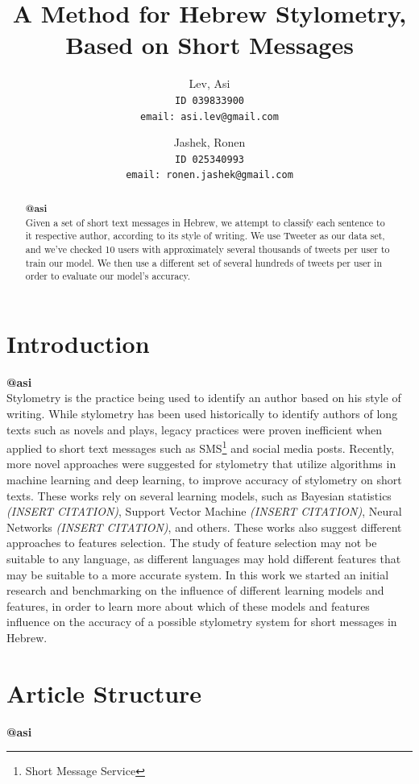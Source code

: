 \documentclass[a4paper]{article}
\author{Lev, Asi\\
	\texttt{ID 039833900}\\
	\texttt{email: asi.lev@gmail.com}
\and
	Jashek, Ronen\\
	\texttt{ID 025340993}\\
	\texttt{email: ronen.jashek@gmail.com}	
}
\title{A Method for Hebrew Stylometry, Based on Short Messages}
\date{}
\begin{document}
\maketitle
\begin{abstract}
\textbf{@asi}\\

Given a set of short text messages in Hebrew, we attempt to classify each sentence to it respective author, according to its style of writing.
We use Tweeter as our data set, and we've checked 10 users with approximately several thousands of tweets per user to train our model.
We then use a different set of several hundreds of tweets per user in order to evaluate our model's accuracy.
\end{abstract}
\section{Introduction}
\textbf{@asi}\\

Stylometry is the practice being used to identify an author based on his style of writing.
While stylometry has been used historically to identify authors of long texts such as novels and plays, legacy practices were proven inefficient when applied to short text messages such as SMS\footnote{Short Message Service} and social media posts.
Recently, more novel approaches were suggested for stylometry that utilize algorithms in machine learning and deep learning, to improve accuracy of stylometry on short texts.
These works rely on several learning models, such as Bayesian statistics \emph{(INSERT CITATION)}, Support Vector Machine \emph{(INSERT CITATION)}, Neural Networks \emph{(INSERT CITATION)}, and others.
These works also suggest different approaches to features selection. The study of feature selection may not be suitable to any language, as different languages may hold different features that may be suitable to a more accurate system.
In this work we started an initial research and benchmarking on the influence of different learning models and features, in order to learn more about which of these models and features influence on the accuracy of a possible stylometry system for short messages in Hebrew.
\section{Article Structure}
\textbf{@asi}\\
\end{document}
